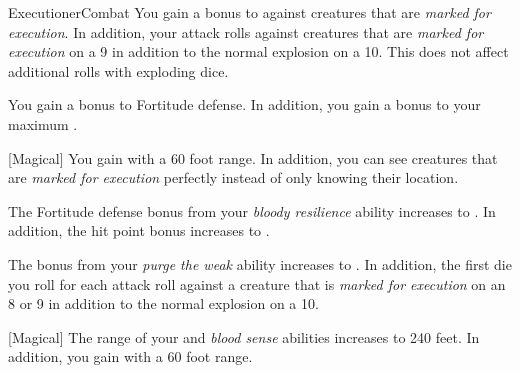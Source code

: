 \begin{feat}{Executioner}{Combat}
         You gain a  bonus to  against creatures that are \textit{marked for execution}.
        In addition, your attack rolls against creatures that are \textit{marked for execution}  on a 9 in addition to the normal explosion on a 10.
        This does not affect additional rolls with exploding dice.

         You gain a  bonus to Fortitude defense.
        In addition, you gain a  bonus to your maximum .

        [Magical] You gain  with a 60 foot range.
        In addition, you can see creatures that are \textit{marked for execution} perfectly instead of only knowing their location.

         The Fortitude defense bonus from your \textit{bloody resilience} ability increases to .
        In addition, the hit point bonus increases to .

         The bonus from your \textit{purge the weak} ability increases to .
        In addition, the first die you roll for each attack roll against a creature that is \textit{marked for execution}  on an 8 or 9 in addition to the normal explosion on a 10.

        [Magical] The range of your  and \textit{blood sense} abilities increases to 240 feet.
        In addition, you gain  with a 60 foot range.
    \end{feat}

